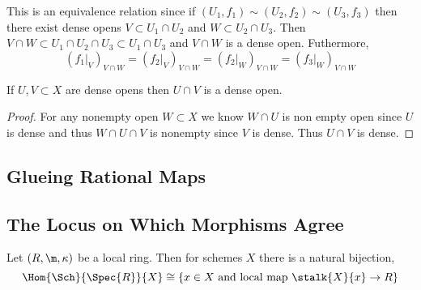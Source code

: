 \documentclass[12pt]{article}
\begin{document}
\begin{remark}
This is an equivalence relation since if $(U_1, f_1) \sim (U_2, f_2) \sim (U_3, f_3)$ then there exist dense opens $V \subset U_1 \cap U_2$ and $W \subset U_2 \cap U_3$. Then $V \cap W \subset U_1 \cap U_2 \cap U_3 \subset U_1 \cap U_3$ and $V \cap W$ is a dense open. Futhermore,
\[ (f_1|_{V})_{V \cap W} = (f_2|_{V})_{V \cap W} = (f_2|_{W})_{V \cap W} = (f_3|_{W})_{V \cap W} \]
\end{remark}

\begin{lemma}
If $U, V \subset X$ are dense opens then $U \cap V$ is a dense open.
\end{lemma}

\begin{proof}
For any nonempty open $W \subset X$ we know $W \cap U$ is non empty open since $U$ is dense and thus $W \cap U \cap V$ is nonempty since $V$ is dense. Thus $U \cap V$ is dense. 
\end{proof}

\subsection{Glueing Rational Maps}

\subsection{The Locus on Which Morphisms Agree}

\begin{lemma}
Let $(R, \m, \kappa)$ be a local ring. Then for schemes $X$ there is a natural bijection,
\[ \Hom{\Sch}{\Spec{R}}{X} \cong \{ x \in X \text{ and local map } \stalk{X}{x} \to R \} \]
\end{lemma}
\end{document}
